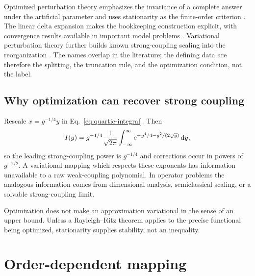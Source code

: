 Optimized perturbation theory emphasizes the invariance of a complete answer
under the artificial parameter and uses stationarity as the finite-order
criterion \cite{Stevenson:1981vj}.  The linear delta expansion makes the
bookkeeping construction explicit, with convergence results available in
important model problems \cite{Buckley:1992pc,Duncan:1992ba}.  Variational
perturbation theory further builds known strong-coupling scaling into the
reorganization \cite{Kleinert:1995hc}.  The names overlap in the literature;
the defining data are therefore the splitting, the truncation rule, and the
optimization condition, not the label.

\subsection{Why optimization can recover strong coupling}
\label{subsec:vpt-strong-coupling}

Rescale $x=g^{-1/4}y$ in Eq.~\eqref{eq:quartic-integral}.  Then
\begin{equation}
  I(g)=g^{-1/4}\frac{1}{\sqrt{2\pi}}
  \int_{-\infty}^{\infty}
  \mathrm{e}^{-y^4/4-y^2/(2\sqrt g)}\,\mathrm{d} y,
  \label{eq:quartic-strong-coupling}
\end{equation}
so the leading strong-coupling power is $g^{-1/4}$ and corrections occur in
powers of $g^{-1/2}$.  A variational mapping which respects these exponents
has information unavailable to a raw weak-coupling polynomial.  In operator
problems the analogous information comes from dimensional analysis,
semiclassical scaling, or a solvable strong-coupling limit.

\begin{checkpointbox}
Optimization does not make an approximation variational in the sense of an
upper bound.  Unless a Rayleigh--Ritz theorem applies to the precise
functional being optimized, stationarity supplies stability, not an
inequality.
\end{checkpointbox}

\section{Order-dependent mapping}
\label{sec:odm-appendix}

